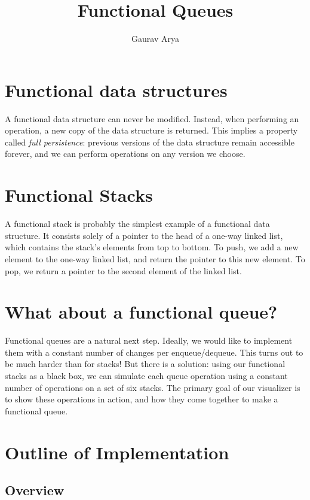 \documentclass[12.5pt]{scrartcl}
\author{Gaurav Arya}
\title{Functional Queues}
\begin{document}
\maketitle

\section{Functional data structures}

A functional data structure can never be modified. Instead, when performing an operation, a new copy of the data structure is returned. This implies a property called \emph{full persistence}: previous versions of the data structure remain accessible forever, and we can perform operations on any version we choose.

\section{Functional Stacks}

A functional stack is probably the simplest example of a functional data structure. It consists solely of a pointer to the head of a one-way linked list, which contains the stack’s elements from top to bottom. To push, we add a new element to the one-way linked list, and return the pointer to this new element. To pop, we return a pointer to the second element of the linked list.

\section{What about a functional queue?}

Functional queues are a natural next step. Ideally, we would like to implement them with a constant number of changes per enqueue/dequeue. This turns out to be much harder than for stacks! But there is a solution: using our functional stacks as a black box, we can simulate each queue operation using a constant number of operations on a set of six stacks. The primary goal of our visualizer is to show these operations in action, and how they come together to make a functional queue.

\section{Outline of Implementation}

\subsection{Overview}
\end{document}
